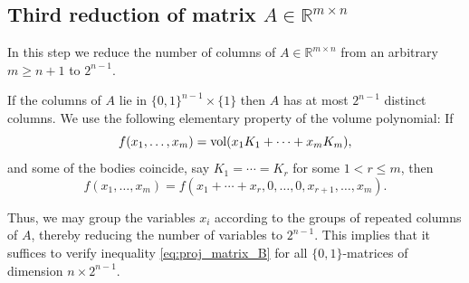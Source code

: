 \documentclass[11pt]{amsart}
\def\vol{{\rm vol}}
\theoremstyle{definition}
\theoremstyle{remark}
\newcommand{\onevec}{\mathbbm{1}}
\begin{document}
\subsection{Third reduction of matrix $A \in \mathbb{R}^{m \times n}$}
In this step we reduce the number of columns of $A \in \mathbb{R}^{m \times n}$ from an arbitrary $m \geq n+1$ to $2^{n-1}$.

If the columns of $A$ lie in $\{0,1\}^{n-1}\times \{1\}$ then $A$ has at most $2^{n-1}$ distinct columns. We use the following elementary property of the volume polynomial: If
\[
f(x_1,\ldots,x_m) = \vol(x_1 K_1 + \cdots + x_m K_m),
\]
and some of the bodies coincide, say $K_1 = \cdots = K_r$ for some $1 <r \leq m$, then
\[
f(x_1,\ldots,x_m) = f(x_1 + \cdots + x_r, 0,\ldots,0, x_{r+1},\ldots,x_m).
\]

Thus, we may group the variables $x_i$ according to the groups of repeated columns of $A$,
thereby reducing the number of variables to $2^{n-1}$. This implies that
it suffices to verify inequality \eqref{eq:proj_matrix_B} for all $\{0,1\}$-matrices
of dimension $n\times 2^{n-1}$.
%

%
\end{document}

